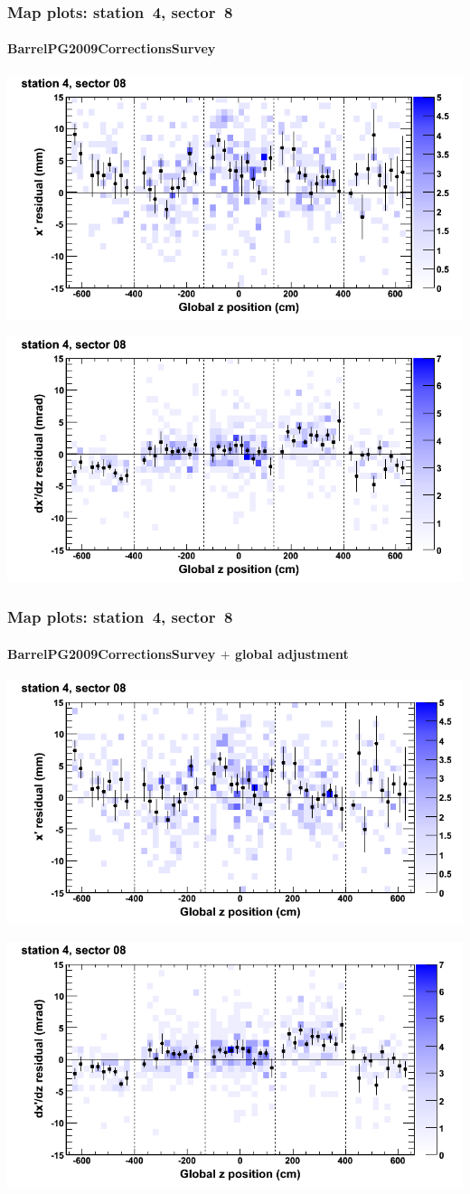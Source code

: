 \documentclass[compress]{beamer}
\begin{document}
\begin{frame}
\frametitle{Map plots: station~4, sector~8}
\framesubtitle{BarrelPG2009CorrectionsSurvey}
\includegraphics[width=0.5\linewidth]{mapplots_01/DTvsz_st4sec08_x.png}

\includegraphics[width=0.5\linewidth]{mapplots_01/DTvsz_st4sec08_dxdz.png}
\end{frame}
\begin{frame}
\frametitle{Map plots: station~4, sector~8}
\framesubtitle{BarrelPG2009CorrectionsSurvey $+$ global adjustment}
\includegraphics[width=0.5\linewidth]{mapplots_re01/DTvsz_st4sec08_x.png}

\includegraphics[width=0.5\linewidth]{mapplots_re01/DTvsz_st4sec08_dxdz.png}
\end{frame}
\end{document}
